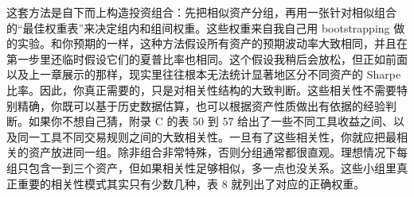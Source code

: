 \begin{chineseblock}这套方法是自下而上构造投资组合：先把相似资产分组，再用一张针对相似组合的“最佳权重表”来决定组内和组间权重。这些权重来自我自己用 bootstrapping 做的实验。和你预期的一样，这种方法假设所有资产的预期波动率大致相同，并且在第一步里还临时假设它们的夏普比率也相同。这个假设我稍后会放松，但正如前面以及上一章展示的那样，现实里往往根本无法统计显著地区分不同资产的 Sharpe 比率。因此，你真正需要的，只是对相关性结构的大致判断。这些相关性不需要特别精确，你既可以基于历史数据估算，也可以根据资产性质做出有依据的经验判断。如果你不想自己猜，附录 C 的表 50 到 57 给出了一些不同工具收益之间、以及同一工具不同交易规则之间的大致相关性。一旦有了这些相关性，你就应把最相关的资产放进同一组。除非组合非常特殊，否则分组通常都很直观。理想情况下每组只包含一到三个资产，但如果相关性足够相似，多一点也没关系。这些小组里真正重要的相关性模式其实只有少数几种，表 8 就列出了对应的正确权重。\end{chineseblock}

